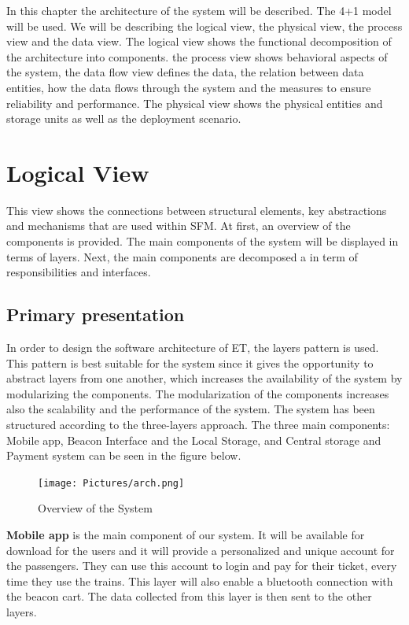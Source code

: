 

In this chapter the architecture of the system will be described. The 4+1 model will be used. We will be describing  the logical view, the physical view, the process view and the data view. 
The logical view shows the functional decomposition of the architecture into components.
the process view shows behavioral aspects of the system, the data flow view defines the data, the relation
between data entities, how the data flows through the system and the measures to ensure reliability and
performance. The physical view shows the physical entities and storage units as well as the deployment
scenario.

\section{Logical View}
This view shows the connections between structural elements, key abstractions and mechanisms that are used within SFM. At first, an overview of the components is provided. The main components of the system will be displayed in terms of layers. Next, the main components are decomposed a in term of responsibilities and interfaces.

\subsection{Primary presentation}
In order to design the software architecture of \ac{ET}, the layers pattern is used. This pattern is best suitable for the system since it gives the opportunity to abstract layers from one another, which increases the availability of the system by modularizing the components. The modularization of the components increases also the scalability and the performance of the system. 
The system has been structured according to the three-layers approach. The three main components: Mobile app, Beacon Interface and the Local Storage, and Central storage and Payment system can be seen in the figure below. 


\begin{figure}[H]
  \centering
  \texttt{[image: Pictures/arch.png]}
  \caption{Overview of the System}
  \label{fig:system}
\end{figure}


\textbf{Mobile app} is the main component of our system. It will be available for download for the users and it will provide a personalized and unique account for the passengers. They can use this account to login and pay for their ticket, every time they use the trains. This layer will also enable a bluetooth connection with the beacon cart. The data collected from this layer is then sent to the other layers. 


